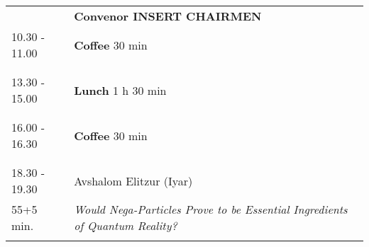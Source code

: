 \begin{longtable}{p{3cm}p{13cm}}
&\hfill {\bf Convenor INSERT CHAIRMEN }\\ 
10.30 - 11.00 & {\bf Coffee} \hfill 30 min \\ 
 & \\ 
 & \\ 
13.30 - 15.00 & {\bf Lunch} \hfill 1 h 30 min \\ 
 & \\ 
 & \\ 
16.00 - 16.30 & {\bf Coffee} \hfill 30 min \\ 
 & \\ 
 & \\ 
18.30 - 19.30 & Avshalom Elitzur (Iyar)\\ 
55+5 min. & {\it Would Nega-Particles Prove to be Essential Ingredients of Quantum Reality?}\\ 
 & \\ 
\end{longtable}

